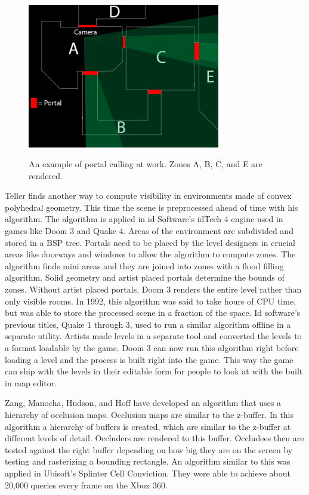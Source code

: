 \documentclass[12pt]{ucthesis}
\newcommand{\captionfonts}{\small\bf\ssp}
\begin{document}
\begin{figure}
\begin{center}
\includegraphics[width=0.75\textwidth]{Images/Portal-Culling.png}
\captionfonts
\caption[Portal Culling]{An example of portal culling at work.  Zones A, B, C, and E are rendered.}
\label{fig:portal-culling}
\end{center}
\end{figure}

Teller finds another way to compute visibility in environments made of convex polyhedral geometry.\cite{Vis-Computations-Densely-Occluded}
This time the scene is preprocessed ahead of time with his algorithm.
The algorithm is applied in id Software's idTech 4 engine used in games like Doom 3 and Quake 4.\cite{Doom3-source-review}
Areas of the environment are subdivided and stored in a BSP tree.
Portals need to be placed by the level designers in crucial areas like doorways and windows to allow the algorithm to compute zones.
The algorithm finds mini areas and they are joined into zones with a flood filling algorithm.
Solid geometry and artist placed portals determine the bounds of zones.
Without artist placed portals, Doom 3 renders the entire level rather than only visible rooms.
In 1992, this algorithm was said to take hours of CPU time, but was able to store the processed scene in a fraction of the space.
Id software's previous titles, Quake 1 through 3, used to run a similar algorithm offline in a separate utility.
Artists made levels in a separate tool and converted the levels to a format loadable by the game.
Doom 3 can now run this algorithm right before loading a level and the process is built right into the game.
This way the game can ship with the levels in their editable form for people to look at with the built in map editor.

Zang, Manocha, Hudson, and Hoff have developed an algorithm that uses a hierarchy of occlusion maps.\cite{heir-occ-map}
Occlusion maps are similar to the z-buffer.
In this algorithm a hierarchy of buffers is created, which are similar to the z-buffer at different levels of detail.
Occluders are rendered to this buffer.
Occludees then are tested against the right buffer depending on how big they are on the screen by testing and rasterizing a bounding rectangle.
An algorithm similar to this was applied in Ubisoft's Splinter Cell Conviction.\cite{spliter}
They were able to achieve about 20,000 queries every frame on the Xbox 360.
\end{document}
